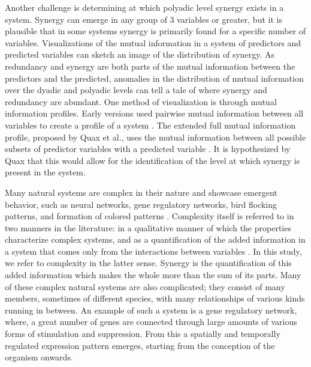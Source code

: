 \documentclass[../main.tex]{subfiles}
\begin{document}
Another challenge is determining at which polyadic level synergy exists in a system.
Synergy can emerge in any group of 3 variables or greater, but it is plausible that in some systems synergy is primarily found for a specific number of variables.
Visualizations of the mutual information in a system of predictors and predicted variables can sketch an image of the distribution of synergy.
As redundancy and synergy are both parts of the mutual information between the predictors and the predicted, anomalies in the distribution of mutual information over the dyadic and polyadic levels can tell a tale of where synergy and redundancy are abundant.
One method of visualization is through mutual information profiles.
Early versions used pairwise mutual information between all variables to create a profile of a system \cite{bar2013computationally}. 
The extended full mutual information profile, proposed by Quax et al., uses the mutual information between all possible subsets of predictor variables with a predicted variable \cite{quax2017quantifying}.
It is hypothesized by Quax that this would allow for the identification of the level at which synergy is present in the system.

Many natural systems are complex in their nature and showcase emergent behavior, such as neural networks, gene regulatory networks, bird flocking patterns, and formation of colored patterns \cite{choi2001supply, gat1999synergy, kondo2010reaction, liang2008gene}.
Complexity itself is referred to in two manners in the literature: in a qualitative manner of which the properties characterize complex systems, and as a quantification of the added information in a system that comes only from the interactions between variables \cite{bar2004multiscale}.
In this study, we refer to complexity in the latter sense.
Synergy is the quantification of this added information which makes the whole more than the sum of its parts.
Many of these complex natural systems are also complicated; they consist of many members, sometimes of different species, with many relationships of various kinds running in between.
An example of such a system is a gene regulatory network, where, a great number of genes are connected through large amounts of various forms of stimulation and suppression.
From this a spatially and temporally regulated expression pattern emerges, starting from the conception of the organism onwards.
\end{document}
